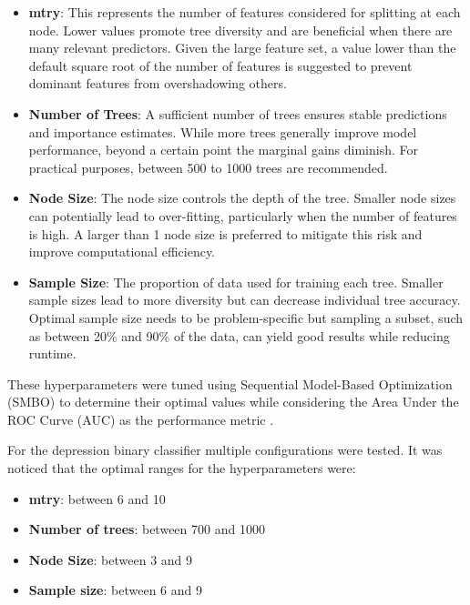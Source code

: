 \begin{itemize}
  \item \textbf{mtry}: This represents the number of features considered for splitting at each node. Lower values promote tree diversity and are beneficial when there are many relevant predictors. Given the large feature set, a value lower than the default square root of the number of features is suggested to prevent dominant features from overshadowing others.
  \item \textbf{Number of Trees}: A sufficient number of trees ensures stable predictions and importance estimates. While more trees generally improve model performance, beyond a certain point the marginal gains diminish. For practical purposes, between 500 to 1000 trees are recommended.
  \item \textbf{Node Size}: The node size controls the depth of the tree. Smaller node sizes can potentially lead to over-fitting, particularly when the number of features is high. A larger than 1 node size is preferred to mitigate this risk and improve computational efficiency.
  \item \textbf{Sample Size}: The proportion of data used for training each tree. Smaller sample sizes lead to more diversity but can decrease individual tree accuracy. Optimal sample size needs to be problem-specific but sampling a subset, such as between 20\% and 90\% of the data, can yield good results while reducing runtime. 
\end{itemize}

These hyperparameters were tuned using Sequential Model-Based Optimization (SMBO) to determine their optimal values while considering the Area Under the ROC Curve (AUC) as the performance metric \cite{probst2019hyperparameters}.

For the depression binary classifier multiple configurations were tested. It was noticed that the optimal ranges for the hyperparameters were:
\begin{itemize}
    \item \textbf{mtry}: between 6 and 10
    \item \textbf{Number of trees}: between 700 and 1000
    \item \textbf{Node Size}: between 3 and 9
    \item \textbf{Sample size}: between 6 and 9
\end{itemize}

